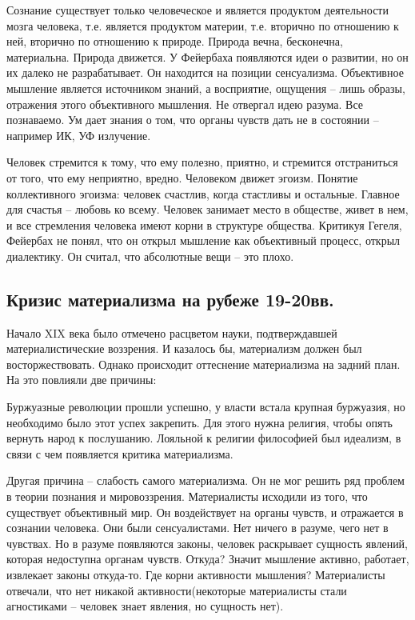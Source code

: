 Сознание существует только человеческое и является продуктом деятельности мозга человека, т.е. является продуктом материи, т.е. вторично по отношению к ней, вторично по отношению к природе. Природа вечна, бесконечна, материальна. Природа движется. У Фейербаха появляются идеи о развитии, но он их далеко не разрабатывает. Он находится на позиции сенсуализма. Объективное мышление является источником знаний, а восприятие, ощущения – лишь образы, отражения этого объективного мышления. Не отвергал идею разума. Все познаваемо. Ум дает знания о том, что органы чувств дать не в состоянии – например ИК, УФ излучение.

Человек стремится к тому, что ему полезно, приятно, и стремится отстраниться от того, что ему неприятно, вредно. Человеком движет эгоизм. Понятие коллективного эгоизма: человек счастлив, когда стастливы и остальные. Главное для счастья – любовь ко всему. Человек занимает место в обществе, живет в нем, и все стремления человека имеют корни в структуре общества. Критикуя Гегеля, Фейербах не понял, что он открыл мышление как объективный процесс, открыл диалектику. Он считал, что абсолютные вещи – это плохо.
\subsection{Кризис материализма на рубеже 19-20вв.}

Начало XIX века было отмечено расцветом науки, подтверждавшей материалистические воззрения. И казалось бы, материализм должен был восторжествовать. Однако происходит оттеснение материализма на задний план. На это повлияли две причины:

Буржуазные революции прошли успешно, у власти встала крупная буржуазия, но необходимо было этот успех закрепить. Для этого нужна религия, чтобы опять вернуть народ к послушанию. Лояльной к религии философией был идеализм, в связи с чем появляется критика материализма.

Другая причина – слабость самого материализма. Он не мог решить ряд проблем в теории познания и мировоззрения. Материалисты исходили из того, что существует объективный мир. Он воздействует на органы чувств, и отражается в сознании человека. Они были сенсуалистами. Нет ничего в разуме, чего нет в чувствах. Но в разуме появляются законы, человек раскрывает сущность явлений, которая недоступна органам чувств. Откуда? Значит мышление активно, работает, извлекает законы откуда-то. Где корни активности мышления? Материалисты отвечали, что нет никакой активности(некоторые материалисты стали агностиками – человек знает явления, но сущность нет).

